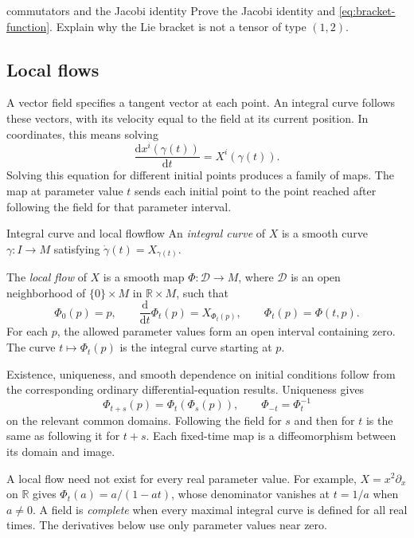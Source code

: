 \documentclass[11pt,a4paper]{article}
\numberwithin{equation}{section}
\newcommand{\R}{\mathbb R}
\newcommand{\dd}{\mathrm d}
\begin{document}
\begin{studentwork}[3.4cm]{commutators and the Jacobi identity}
Prove the Jacobi identity and \eqref{eq:bracket-function}. Explain why
the Lie bracket is not a tensor of type \((1,2)\).
\end{studentwork}

\subsection{Local flows}

A vector field specifies a tangent vector at each point. An integral
curve follows these vectors, with its velocity equal to the field at
its current position. In coordinates, this means solving
\[
 \frac{\dd x^i(\gamma(t))}{\dd t}=X^i(\gamma(t)).
\]
Solving this equation for different initial points produces a family
of maps. The map at parameter value \(t\) sends each initial point to
the point reached after following the field for that parameter interval.

\begin{definition}{Integral curve and local flow}{flow}
An \emph{integral curve} of \(X\) is a smooth curve \(\gamma:I\to M\)
satisfying \(\dot\gamma(t)=X_{\gamma(t)}\).

The \emph{local flow} of \(X\) is a smooth map
\(\Phi:\mathcal D\to M\), where \(\mathcal D\) is an open neighborhood
of \(\{0\}\times M\) in \(\R\times M\), such that
\[
 \Phi_0(p)=p,\qquad
 \frac{\dd}{\dd t}\Phi_t(p)=X_{\Phi_t(p)},
 \qquad \Phi_t(p)=\Phi(t,p).
\]
For each \(p\), the allowed parameter values form an open interval
containing zero. The curve \(t\mapsto\Phi_t(p)\) is the integral
curve starting at \(p\).
\end{definition}

Existence, uniqueness, and smooth dependence on initial conditions
follow from the corresponding ordinary differential-equation results.
Uniqueness gives
\[
 \Phi_{t+s}(p)=\Phi_t(\Phi_s(p)),\qquad
 \Phi_{-t}=\Phi_t^{-1}
\]
on the relevant common domains. Following the field for \(s\) and
then for \(t\) is the same as following it for \(t+s\). Each fixed-time
map is a diffeomorphism between its domain and image.

A local flow need not exist for every real parameter value. For example,
\(X=x^2\partial_x\) on \(\R\) gives
\(\Phi_t(a)=a/(1-at)\), whose denominator vanishes at \(t=1/a\) when
\(a\neq0\). A field is \emph{complete} when every maximal integral
curve is defined for all real times. The derivatives below use only
parameter values near zero.
\end{document}
